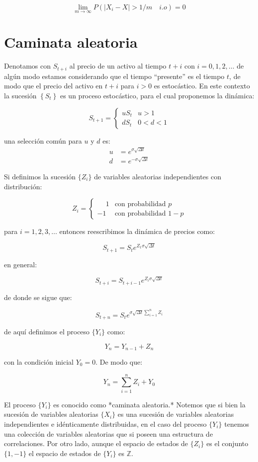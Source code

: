 \documentclass{extreport}
\theoremstyle{definicion}
\theoremstyle{propiedad}
\begin{document}
$$
\lim_{m\rightarrow\infty}P\left(\vert X_i-X\vert > 1/m \quad i.o\right) = 0
$$

\section{Caminata aleatoria}

Denotamos con $S_{t+i}$ al  precio de un activo al tiempo $t+i$ con $i=0,1,2,\ldots$ de algún modo estamos considerando que el tiempo “presente” es el tiempo $t$, de modo que el precio del activo en $t+i$ para $i>0$ es estocástico. En este contexto  la sucesión $\left\{S_t\right\}$ es un proceso estocástico, para el cual proponemos la dinámica: 

$$
S_{t+1} = \begin{cases}
    uS_t & u>1 \\ 
    dS_t & 0<d<1
\end{cases}
$$

una selección común para $u$ y $d$ es:
\begin{align*}
    u  & = e^{\sigma \sqrt{\Delta t}}\\
    d  & = e^{-\sigma \sqrt{\Delta t}}
\end{align*}

Si definimos la sucesión $\{Z_i\}$ de variables aleatorias independientes con distribución:

$$
Z_i = \begin{cases} \phantom{-}1 & \text{con probabilidad }p  \\ 
-1 & \text{con probabilidad }1-p\end{cases}
$$

para $i = 1,2,3,\ldots$ entonces reescribimos la dinámica de precios como:

$$
S_{t+1} = S_te^{Z_1\sigma\sqrt{\Delta t}}
$$

en general:

$$
S_{t+i} = S_{t+i-1}e^{Z_{i}\sigma\sqrt{\Delta t}}
$$

de donde se sigue que:

$$
S_{t+n} = S_{t}e^{\sigma\sqrt{\Delta t}\sum_{i=1}^nZ_i}
$$

de aquí definimos el proceso $\{Y_i\}$  como:

$$
Y_n = Y_{n-1} + Z_n
$$

con la condición inicial $Y_0 = 0$. De modo que:

$$
Y_n = \sum_{i=1}^n Z_i + Y_0
$$

El proceso $\{Y_i\}$ es conocido como *caminata aleatoria.* Notemos que si bien la sucesión de variables aleatorias $\{X_i\}$ es una sucesión de variables aleatorias independientes e idénticamente distribuidas, en el caso del proceso $\{Y_i\}$ tenemos una colección de variables aleatorias que si poseen una estructura de correlaciones. Por otro lado, aunque el espacio de estados de $\{Z_i\}$ es el conjunto $\{1,-1\}$ el espacio de estados de $\{Y_i\}$ es $\mathbb{Z}.$ 
\end{document}

